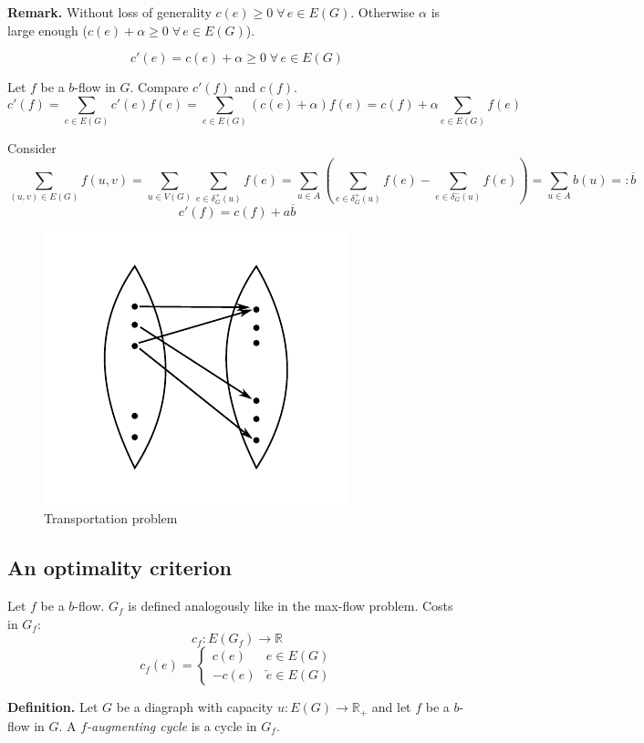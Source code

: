 \documentclass{article}
\newcommand{\fall}{\;\forall\,}
\begin{document}
\textbf{Remark.}
  Without loss of generality $c(e) \geq 0 \fall e \in E(G)$.
  Otherwise $\alpha$ is large enough ($c(e) + \alpha \geq 0 \fall e \in E(G)$).

\[ c'(e) = c(e) + \alpha \geq 0 \fall e \in E(G) \]

Let $f$ be a $b$-flow in $G$. Compare $c'(f)$ and $c(f)$.
\[
  c'(f)
    = \sum_{e \in E(G)} c'(e) f(e)
    = \sum_{e \in E(G)} (c(e) + \alpha) f(e)
    = c(f) + \alpha \sum_{e \in E(G)} f(e)
\]

Consider
\[
  \sum_{(u,v) \in E(G)} f(u,v)
    = \sum_{u \in V(G)} \sum_{e \in \delta^+_G(u)} f(e)
    = \sum_{u \in A} \left( \sum_{e \in \delta^+_G(u)} f(e) - \sum_{e \in \delta^-_G(u)} f(e) \right)
    = \sum_{u \in A} b(u) =: \overline{b}
\] \[
  c'(f) = c(f) + a\overline{b}
\]

\begin{figure}[ht]
 \begin{center}
  \includegraphics{img/transportation_problem.pdf}
  \caption{Transportation problem}
 \end{center}
\end{figure}

\subsection{An optimality criterion}
%
Let $f$ be a $b$-flow. $G_f$ is defined analogously like in the max-flow problem. Costs in $G_f$:
\[
  c_f: E(G_f) \rightarrow \mathbb{R}
\] \[
  c_f(e) = \begin{cases}
    c(e) & e \in E(G) \\
    -c(e) & \overleftarrow{e} \in E(G)
  \end{cases}
\]

\textbf{Definition.}
  Let $G$ be a diagraph with capacity $u: E(G) \rightarrow \mathbb{R}_+$ and let $f$ be a $b$-flow in $G$.
  A \emph{$f$-augmenting cycle} is a cycle in $G_f$.
\end{document}
